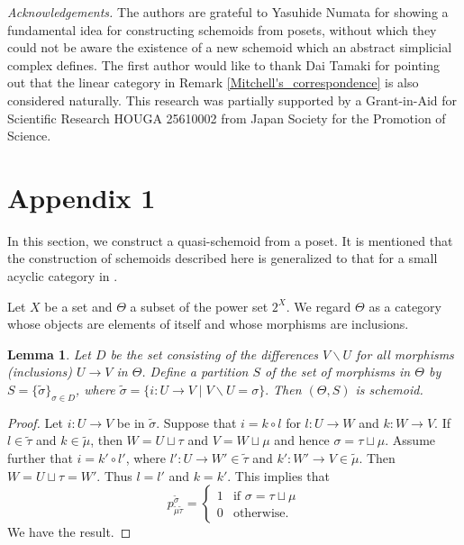 \documentclass{amsart}
\newtheorem{lem}[thm]{Lemma}
\theoremstyle{definition}
\theoremstyle{remark}
\begin{document}
\medskip
\noindent
{\it Acknowledgements.}
The authors are grateful to Yasuhide Numata for showing a fundamental idea for constructing  schemoids from posets, 
without which they could not be aware the existence of a new schemoid which an abstract simplicial complex defines. 
The first author would like to thank Dai Tamaki for pointing out that the linear category in 
Remark \ref{Mitchell's_correspondence} is also considered naturally. 
This research was partially supported by a Grant-in-Aid for Scientific Research HOUGA 25610002 
from Japan Society for the Promotion of Science.
 
\section{Appendix 1}
In this section, we construct a quasi-schemoid from a poset. It is mentioned that the construction 
of schemoids described here is generalized to that for a small acyclic category in \cite{Numata}.  

Let $X$ be a set and $\Theta$ a subset of the power set $2^X$. We regard $\Theta$ as a category whose objects are elements of itself and whose morphisms are inclusions. 

\begin{lem}\label{lem:construction}
Let $D$ be the set consisting of the differences $V\backslash U$ for all morphisms (inclusions) $U \to V$ in $\Theta$. Define 
a partition $S$ of the set of morphisms in $\Theta$ by $S = \{\widetilde{\sigma}\}_{\sigma \in D}$, where 
$\widetilde{\sigma} = \{ i : U \to V \mid V\backslash U = \sigma\}.$ Then $(\Theta, S)$ is schemoid. 
\end{lem}

\begin{proof}
Let $i : U \to V$ be in $\widetilde{\sigma}$. Suppose that 
$i = k\circ l$ for $l : U \to W$ and $k : W \to V$. If $l\in \widetilde{\tau}$ and $k \in \widetilde{\mu}$, then $W = U\sqcup \tau$ and 
$V = W \sqcup \mu$ and hence $\sigma =  \tau \sqcup \mu$. Assume further that $i = k'\circ l'$, where 
$l' : U \to W' \in \widetilde{\tau}$ and $k' : W' \to V \in \widetilde{\mu}$. Then $W = U \sqcup \tau = W'$. Thus $l=l'$ and $k=k'$. This implies that 
$$
p^{\widetilde{\sigma}}_{\widetilde{\mu} \widetilde{\tau}}= \begin{cases}
1 & \text{if $\sigma =  \tau \sqcup \mu$}  \\
0 & \text{otherwise}. 
\end{cases}
$$
We have the result. 
\end{proof}
\end{document}
